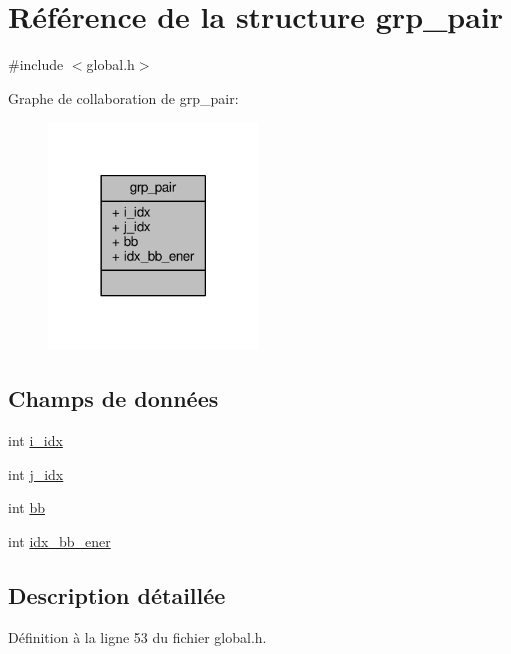 \hypertarget{structgrp__pair}{\section{Référence de la structure grp\+\_\+pair}
\label{structgrp__pair}
}


{\ttfamily \#include $<$global.\+h$>$}



Graphe de collaboration de grp\+\_\+pair\+:\nopagebreak
\begin{figure}[H]
\begin{center}
\leavevmode
\includegraphics[width=158pt]{structgrp__pair__coll__graph}
\end{center}
\end{figure}
\subsection*{Champs de données}
\begin{DoxyCompactItemize}
\item 
int \hyperlink{structgrp__pair_ab388fed1b507336da2f0b68be33ce801}{i\+\_\+idx}
\item 
int \hyperlink{structgrp__pair_a5e1eb3ec5fbf8cbad20864b3065eca4f}{j\+\_\+idx}
\item 
int \hyperlink{structgrp__pair_a505e8d72d6acb9b36552b8431e1b01f8}{bb}
\item 
int \hyperlink{structgrp__pair_a3fb4ca165efc17241f2e3d4f51dd2add}{idx\+\_\+bb\+\_\+ener}
\end{DoxyCompactItemize}


\subsection{Description détaillée}


Définition à la ligne 53 du fichier global.\+h.




